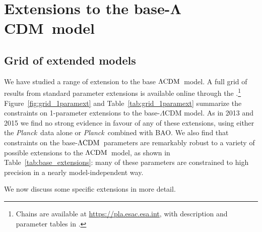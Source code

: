 \documentclass[longauth,traditabstract]{aa}
\def\Planck{\textit{Planck}}
\newcommand{\lcdm}{\texorpdfstring{{$\rm{\Lambda CDM}$}}{ΛCDM}}
\newcommand{\boldlcdm}{\texorpdfstring{$\boldsymbol{\Lambda}$CDM}{ΛCDM}}
\newcommand{\PLA}{\citetalias{PLA}}
\begin{document}
\section{Extensions to the base-\boldlcdm\ model}\label{sec:maingrid}

\subsection{Grid of extended models}\label{sec:grid}
We have studied a range of extension to the base \lcdm\ model. A
full grid of results from standard parameter extensions is available online through the \PLA.\footnote{Chains are available at \url{https://pla.esac.esa.int}, with description and parameter tables in \citet{planck2016-ES}.}
Figure~\ref{fig:grid_1paramext} and Table~\ref{tab:grid_1paramext}
summarize the constraints on 1-parameter extensions to the base-$\Lambda$CDM
model.  As in 2013 and 2015 we find no strong evidence in favour of any of
these extensions, using either the \Planck\ data alone or \Planck\ combined
with BAO. We also find that constraints on the base-\lcdm\ parameters are remarkably robust to a variety of possible extensions to the \lcdm\ model, as shown in Table~\ref{tab:base_extensions}: many of these parameters are constrained to high precision
in a nearly model-independent way.

We now discuss some specific extensions in more detail.
\end{document}
